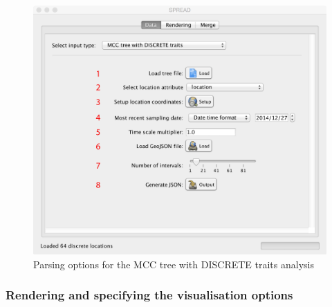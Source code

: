 \documentclass[english]{paper}
\begin{document}
\begin{figure}[!H]
\centering
\includegraphics[width=1\textwidth]{./figures/Fig1_parsing_discrete.pdf} %
\caption{Parsing options for the MCC tree with DISCRETE traits analysis}
\label{fig:parseDiscrete}
\end{figure}

\subsubsection{Rendering and specifying the visualisation options}
\end{document}

